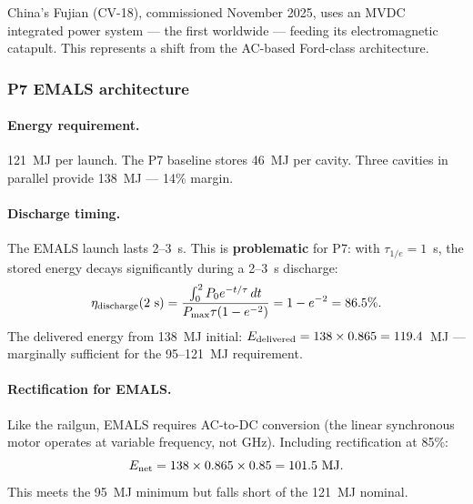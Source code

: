 \documentclass[11pt]{article}
\newcommand{\Pmax}{P_{\rm max}}
\begin{document}
China's Fujian (CV-18), commissioned November 2025, uses an MVDC
integrated power system --- the first worldwide --- feeding its
electromagnetic catapult. This represents a shift from the AC-based
Ford-class architecture.

\subsubsection{P7 EMALS architecture}

\paragraph{Energy requirement.} 121~MJ per launch. The P7 baseline
stores 46~MJ per cavity. Three cavities in parallel provide 138~MJ
--- 14\% margin.

\paragraph{Discharge timing.} The EMALS launch lasts 2--3~s. This
is \textbf{problematic} for P7: with $\tau_{1/e} = 1$~s, the stored
energy decays significantly during a 2--3~s discharge:
\begin{equation}
\eta_{\rm discharge}(2~\text{s}) = \frac{\int_0^2 P_0 e^{-t/\tau}\,dt}
{\Pmax\tau(1-e^{-2})} = 1 - e^{-2} = 86.5\%.
\end{equation}
The delivered energy from 138~MJ initial:
$E_{\rm delivered} = 138 \times 0.865 = 119.4$~MJ --- marginally
sufficient for the 95--121~MJ requirement.

\paragraph{Rectification for EMALS.} Like the railgun, EMALS requires
AC-to-DC conversion (the linear synchronous motor operates at variable
frequency, not GHz). Including rectification at 85\%:
\begin{equation}
E_{\rm net} = 138 \times 0.865 \times 0.85 = 101.5~\text{MJ}.
\end{equation}
This meets the 95~MJ minimum but falls short of the 121~MJ nominal.
\end{document}
